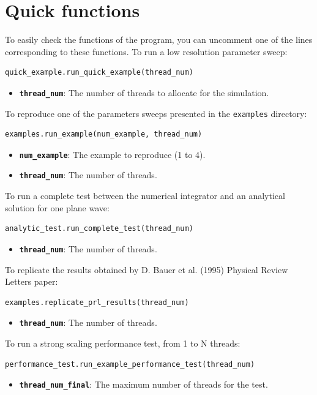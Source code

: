 \documentclass[11pt, a4paper]{article}
\begin{document}
\section{Quick functions}
To easily check the functions of the program, you can uncomment one of the lines corresponding to these functions.
To run a low resolution parameter sweep:
\begin{lstlisting}[language=Python]
quick_example.run_quick_example(thread_num)
\end{lstlisting}
\begin{itemize}
    \item \textbf{\texttt{thread\_num}}: The number of threads to allocate for the simulation.
\end{itemize}
To reproduce one of the parameters sweeps presented in the \texttt{examples} directory:
\begin{lstlisting}[language=Python]
examples.run_example(num_example, thread_num)
\end{lstlisting}
\begin{itemize}
    \item \textbf{\texttt{num\_example}}: The  example to reproduce (1 to 4).
    \item \textbf{\texttt{thread\_num}}: The number of threads.
\end{itemize}
To run a complete test between the numerical integrator and an analytical solution for one plane wave:
\begin{lstlisting}[language=Python]
analytic_test.run_complete_test(thread_num)
\end{lstlisting}
\begin{itemize}
    \item \textbf{\texttt{thread\_num}}: The number of threads.
\end{itemize}
To replicate the results obtained by D. Bauer et al. (1995) Physical Review Letters paper:
\begin{lstlisting}[language=Python]
examples.replicate_prl_results(thread_num)
\end{lstlisting}
\begin{itemize}
    \item \textbf{\texttt{thread\_num}}: The number of threads.
\end{itemize}
To run a strong scaling performance test, from 1 to N threads:
\begin{lstlisting}[language=Python]
performance_test.run_example_performance_test(thread_num)
\end{lstlisting}
\begin{itemize}
    \item \textbf{\texttt{thread\_num\_final}}: The maximum number of threads for the test.
\end{itemize}
\end{document}
